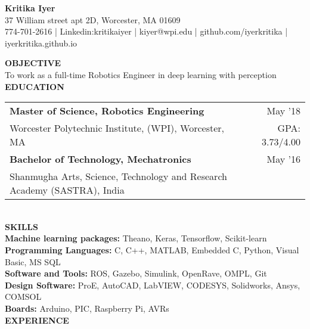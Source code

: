 \documentclass[10pt,a4paper]{article}
\begin{document}
\begin{center}

\textbf{\Large{Kritika Iyer}}\\
37 William street apt 2D, Worcester, MA 01609\\
774-701-2616 | Linkedin:kritikaiyer | kiyer@wpi.edu | github.com/iyerkritika | iyerkritika.github.io\\
\end{center}
\textbf{OBJECTIVE} \\
To work as a full-time Robotics Engineer in deep learning with perception \\[1\baselineskip]
\textbf{EDUCATION}\\
\begin{tabular}{p{} r}
\textbf{Master of Science, Robotics Engineering} & May '18 \\
Worcester Polytechnic Institute, (WPI), Worcester, MA & GPA: 3.73/4.00 \\[1ex]
\textbf{Bachelor of Technology, Mechatronics} & May '16 \\
Shanmugha Arts, Science, Technology  and Research Academy (SASTRA), India
\end{tabular}
\\[1\baselineskip]
\textbf{SKILLS}\\
\textbf{Machine learning packages:} Theano, Keras, Tensorflow, Scikit-learn\\
\textbf{Programming Languages:} C, C++, MATLAB, Embedded C, Python, Visual Basic, MS SQL\\
\textbf{Software and Tools:} ROS, Gazebo, Simulink, OpenRave, OMPL, Git\\
\textbf{Design Software:} ProE, AutoCAD, LabVIEW, CODESYS, Solidworks, Ansys, COMSOL\\
\textbf{Boards:} Arduino, PIC, Raspberry Pi, AVRs\\[1\baselineskip]
\textbf{EXPERIENCE}\\
\end{document}
